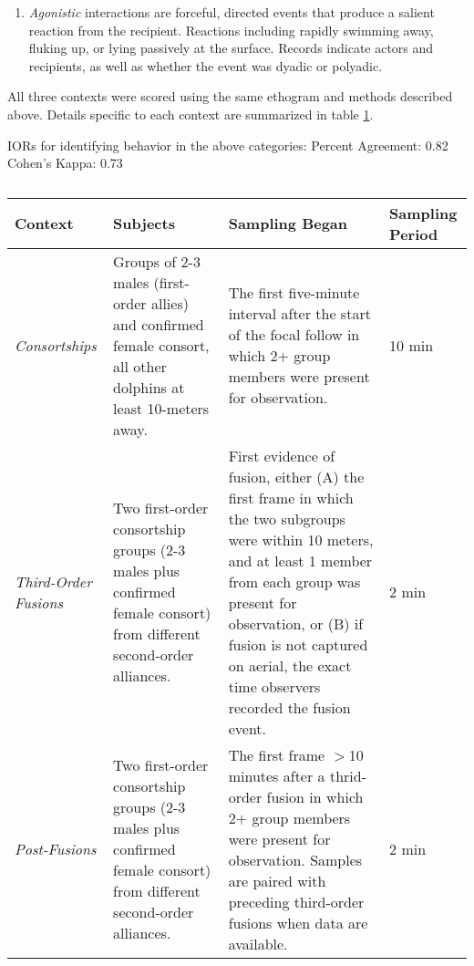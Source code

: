 \documentclass[11pt]{amsart}
\begin{document}
\begin{enumerate}
\item{\emph{Agonistic}} interactions are forceful, directed events that produce a salient reaction from the recipient. Reactions including rapidly swimming away, fluking up, or lying passively at the surface. Records indicate actors and recipients, as well as whether the event was dyadic or polyadic. 
\end{enumerate}

All three contexts were scored using the same ethogram and methods described above. Details specific to each context are summarized in table \ref{table:contexts}.  

IORs for identifying behavior in the above categories: 
Percent Agreement: 0.82
Cohen's Kappa: 0.73


\begin{table}
\begin{tabular}{| p{2cm} | p{5cm} | p{5cm} | p{2.6cm}|}
\hline
Context & Subjects & Sampling Began & Sampling Period 
\\ \hline
\emph{Consortships}
& Groups of 2-3 males (first-order allies) and confirmed female consort, all other dolphins at least 10-meters away. 
& The first five-minute interval after the start of the focal follow in which 2+ group members were present for observation.
& 10 min
\\ \hline
\emph{Third-Order Fusions}
& Two first-order consortship groups (2-3 males plus confirmed female consort) from different second-order alliances.
& First evidence of fusion, either (A) the first frame in which the two subgroups were within 10 meters, and at least 1 member from each group was present for observation, or (B) if fusion is not captured on aerial, the exact time observers recorded the fusion event.
& 2 min
\\ \hline
\emph{Post-Fusions}
& Two first-order consortship groups (2-3 males plus confirmed female consort) from different second-order alliances.
& The first frame $>$10 minutes after a thrid-order fusion in which 2+ group members were present for observation. Samples are paired with preceding third-order fusions when data are available.
& 2 min
\\\hline
\end{tabular}
\caption{}
\label{table:contexts}
\end{table}
\end{document}

